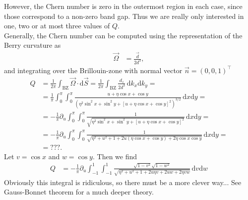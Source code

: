 \documentclass[english, parskip=full]{scrartcl}
\newcommand{\intx}{}
\newcommand{\kla}{}
\newcommand{\klam}{}
\newcommand{\tecxt}{}
\begin{document}

However, the Chern number is zero in the outermost region in each case, since those correspond to a non-zero band gap.
Thus we are really only interested in one, two or at most three values of $Q$.
\\
Generally, the Chern number can be computed using the representation of the Berry curvature as
\begin{align}
\vec{\Omega} &= \frac{\vec{d}}{2d^3},
\end{align}
and integrating over the Brillouin-zone with normal vector $\vec{n} = (0,0,1)^\top$
\begin{align}
Q &= \frac{1}{2\pi}\intx\int_{\tecxt\text{BZ}}^{ }\vec{\Omega}\cdot\mathrm{d}\vec{S} = \frac{1}{2\pi} \intx\int_{\tecxt\text{BZ}}^{ } \frac{d_z}{2d^3}\, \mathrm{d}k_x \tecxt\text{d}k_y = \\
&= \frac{1}{\pi}\intx\int_{0}^{\pi}\intx\int_{0}^{\pi}\frac{u + \eta\cos x + \cos y}{\kla\left( \eta^2\sin^2x + \sin^2y + \klam\left[ u + \eta\cos x + \cos y \right]^2 \right)^{3/2}}\, \mathrm{d}x \mathrm{d}y = \\
&= -\frac{1}{\pi} \partial_u\intx\int_{0}^{\pi}\intx\int_{0}^{\pi} \frac{1}{\sqrt{\eta^2\sin^2x + \sin^2y + \klam\left[ u + \eta\cos x + \cos y \right]^2}} \, \mathrm{d}x \mathrm{d}y = \\
&= -\frac{1}{\pi} \partial_u\intx\int_{0}^{\pi}\intx\int_{0}^{\pi} \frac{1}{\sqrt{\eta^2 + u^2 + 1 + 2u (\eta\cos x + \cos y) + 2\eta\cos x\cos y}} \, \mathrm{d}x \mathrm{d}y = \\
&= ???.
\end{align}
Let $v=\cos x$ and $w=\cos y$.
Then we find
\begin{align}
Q &= -\frac{1}{\pi}\partial_u\intx\int_{-1}^{1}\intx\int_{-1}^{1} \frac{\sqrt{1-v^2}\sqrt{1-w^2}}{\sqrt{\eta^2+u^2+1+2u\eta v + 2uw+2\eta vw}}\, \mathrm{d}v \mathrm{d}w
\end{align}
Obviously this integral is ridiculous, so there must be a more clever way... 
See Gauss-Bonnet theorem for a much deeper theory.
\end{document}
